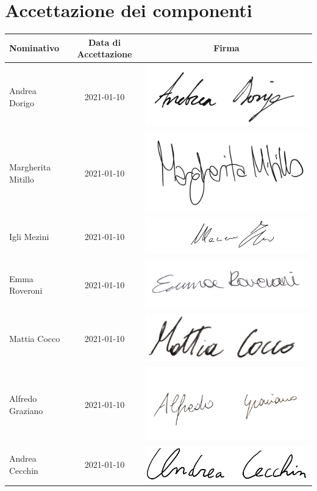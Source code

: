 {{\section{Accettazione dei componenti}\label{OrganigrammaAccettazioneDeiComponenti}
\quad
\def\tabularxcolumn#1{m{#1}}
{	
	\begin{center}
		\renewcommand{\arraystretch}{1.4}
		\begin{tabularx}{\textwidth}{|X|c|c|}
			\hline
			\rowcolor{airforceblue}
			\textbf{Nominativo} & \textbf{Data di Accettazione} & \textbf{Firma}\\
			\hline
			Andrea Dorigo & 2021-01-10 & \includegraphics[width=0.2\linewidth]{../immagini/firme/firma_andrea_dorigo.png}\\
			\hline
			Margherita Mitillo & 2021-01-10 & \includegraphics[width=0.2\linewidth]{../immagini/firme/firma_margherita.png}\\
			\hline
			Igli Mezini & 2021-01-10 &\includegraphics[width=0.3\linewidth]{../immagini/firme/firma_igli.png}\\
			\hline
			Emma Roveroni & 2021-01-10 &\includegraphics[width=0.2\linewidth]{../immagini/firme/firma_emma.png}\\
			\hline
			Mattia Cocco & 2021-01-10 &\includegraphics[width=0.2\linewidth]{../immagini/firme/firma_mattia.png}\\
			\hline
			Alfredo Graziano & 2021-01-10 &\includegraphics[width=0.2\linewidth]{../immagini/firme/firma_alfredo.png}\\
			\hline
			Andrea Cecchin & 2021-01-10 & \includegraphics[width=0.2\linewidth]{../immagini/firme/firma_andrea_c.png}\\
			\hline
		\end{tabularx}
	\end{center}
\clearpage
}}}
